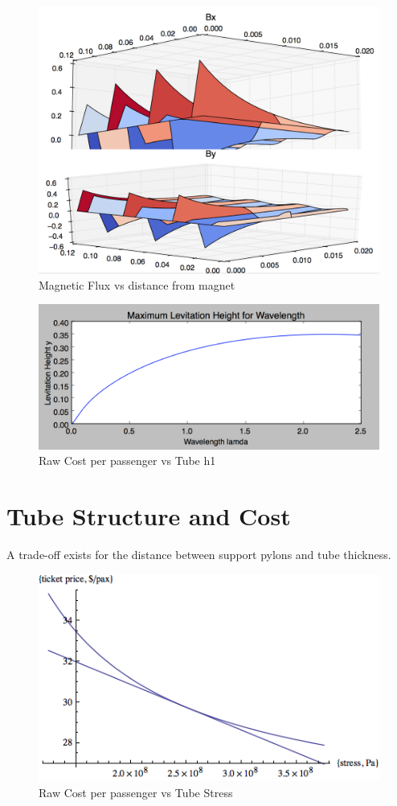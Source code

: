 \documentclass[heading.tex]{subfiles}
\begin{document}
\begin{figure}[hbtp]
\centering
\includegraphics[width=.75\textwidth]{images/halbach1.png}
 \caption[h1]{Magnetic Flux vs distance from magnet}
\label{f:h1}
\end{figure}

\begin{figure}[hbtp]
\centering
\includegraphics[width=.75\textwidth]{images/halbach2.png}
 \caption[h2]{Raw Cost per passenger vs Tube h1}
\label{f:h2}
\end{figure}


\section{Tube Structure and Cost}

A trade-off exists for the distance between support pylons and tube thickness.

\begin{figure}[hbtp]
\centering
\includegraphics[width=.75\textwidth]{images/cost_stress.png}
 \caption[stress]{Raw Cost per passenger vs Tube Stress}
\label{f:stress}
\end{figure}
\end{document}
